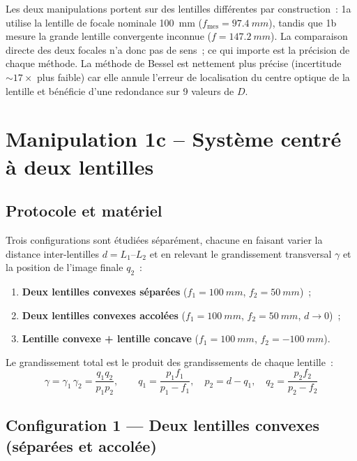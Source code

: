 ﻿\documentclass[a4paper, 11pt]{article}
\begin{document}
Les deux manipulations portent sur des lentilles différentes par construction~: 1a utilise la lentille de focale nominale \SI{100}{mm} ($f_\text{mes} = \SI{97.4}{mm}$), tandis que 1b mesure la grande lentille convergente inconnue ($f = \SI{147.2}{mm}$). La comparaison directe des deux focales n'a donc pas de sens~; ce qui importe est la précision de chaque méthode. La méthode de Bessel est nettement plus précise (incertitude $\sim\!17\times$ plus faible) car elle annule l'erreur de localisation du centre optique de la lentille et bénéficie d'une redondance sur 9 valeurs de $D$.

\section{Manipulation 1c – Système centré à deux lentilles}

\subsection{Protocole et matériel}

Trois configurations sont étudiées séparément, chacune en faisant varier la distance inter-lentilles $d = L_1$–$L_2$ et en relevant le grandissement transversal $\gamma$ et la position de l'image finale $q_2$~:
\begin{enumerate}
  \item \textbf{Deux lentilles convexes séparées} ($f_1 = \SI{100}{mm}$, $f_2 = \SI{50}{mm}$)~;
  \item \textbf{Deux lentilles convexes accolées} ($f_1 = \SI{100}{mm}$, $f_2 = \SI{50}{mm}$, $d \to 0$)~;
  \item \textbf{Lentille convexe + lentille concave} ($f_1 = \SI{+100}{mm}$, $f_2 = \SI{-100}{mm}$).
\end{enumerate}
Le grandissement total est le produit des grandissements de chaque lentille~:
\begin{equation}
  \gamma = \gamma_1\,\gamma_2 = \frac{q_1 q_2}{p_1 p_2},
  \qquad q_1 = \frac{p_1 f_1}{p_1-f_1},\quad p_2 = d - q_1,\quad q_2 = \frac{p_2 f_2}{p_2-f_2}
  \label{eq:chaine}
\end{equation}

\subsection{Configuration 1 — Deux lentilles convexes (séparées et accolée)}
\end{document}
